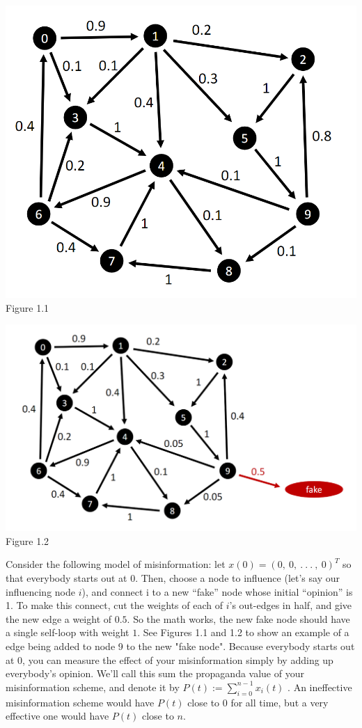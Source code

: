 \documentclass[letterpaper]{article}
\begin{document}
\begin{center}
	\includegraphics[scale=0.7]{./Images/Figure1.1} \\
	Figure 1.1
\end{center}
\begin{center}
	\includegraphics[scale=0.7]{./Images/Figure1.2} \\
	 Figure 1.2
\end{center}

\noindent Consider the following model of misinformation: let $x(0) = (0,\ 0, \ . \ . \ . \ , \ 0)^T$ so that everybody starts out at 0. Then, choose a node to influence (let’s say our influencing node $i$), and connect i to a new “fake” node whose initial “opinion” is 1. To make this connect, cut the weights of each of $i$’s out-edges in half, and give the new edge a weight of $0.5$. So the math works, the new fake node should have a single self-loop with weight $1$. See Figures 1.1 and 1.2 to show an example of a edge being added to node 9 to the new "fake node".  Because everybody starts out at 0, you can measure the effect of your misinformation simply by adding up everybody’s opinion. We’ll call this sum the propaganda value of your misinformation scheme, and denote it by $P(t) := \sum^{n-1}_{i=0} x_i(t)$ . An ineffective misinformation scheme would have $P(t)$ close to 0 for all time, but a very effective one would have $P(t)$ close to $n$.
\end{document}
